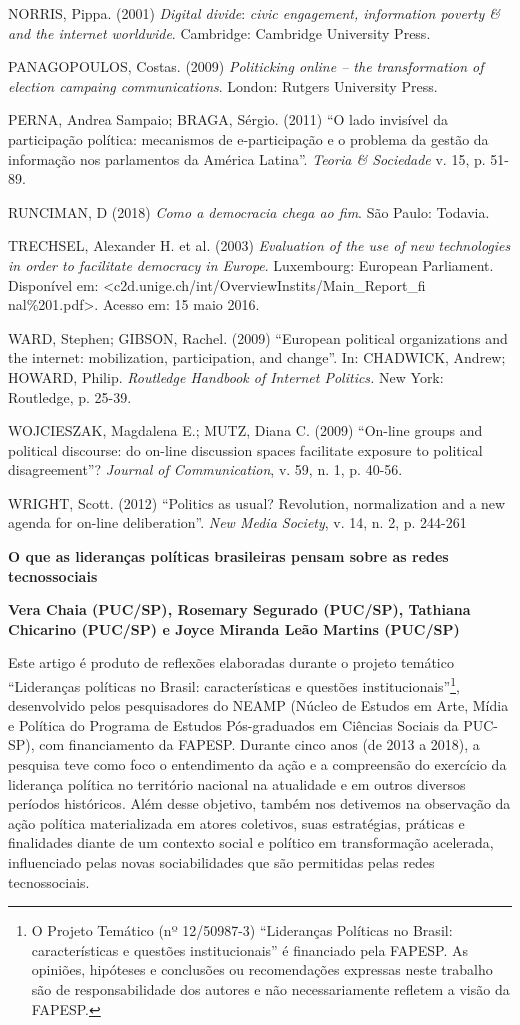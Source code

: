 NORRIS, Pippa. (2001) \emph{Digital divide}: \emph{civic engagement,
information poverty \& and the internet worldwide}. Cambridge: Cambridge
University Press.

PANAGOPOULOS, Costas. (2009) \emph{Politicking online -- the
transformation of election campaing communications}. London: Rutgers
University Press.

PERNA, Andrea Sampaio; BRAGA, Sérgio. (2011) ``O lado invisível da
participação política: mecanismos de e-participação e o problema da
gestão da informação nos parlamentos da América Latina''. \emph{Teoria
\& Sociedade} v. 15, p. 51-89.

RUNCIMAN, D (2018) \emph{Como a democracia chega ao fim}. São Paulo:
Todavia.

TRECHSEL, Alexander H. et al. (2003) \emph{Evaluation of the use of new
technologies in order to facilitate democracy in Europe}. Luxembourg:
European Parliament. Disponível em:
\textless{}c2d.unige.ch/int/OverviewInstits/Main\_Report\_fi
nal\%201.pdf\textgreater{}. Acesso em: 15 maio 2016.

WARD, Stephen; GIBSON, Rachel. (2009) ``European political organizations
and the internet: mobilization, participation, and change''. In:
CHADWICK, Andrew; HOWARD, Philip. \emph{Routledge Handbook of Internet
Politics.} New York: Routledge, p. 25-39.

WOJCIESZAK, Magdalena E.; MUTZ, Diana C. (2009) ``On-line groups and
political discourse: do on-line discussion spaces facilitate exposure to
political disagreement''? \emph{Journal of Communication}, v. 59, n. 1,
p. 40-56.

WRIGHT, Scott. (2012) ``Politics as usual? Revolution, normalization and
a new agenda for on-line deliberation''. \emph{New Media Society}, v.
14, n. 2, p. 244-261

\textbf{O que as lideranças políticas brasileiras pensam sobre as redes
tecnossociais }

\textbf{Vera Chaia (PUC/SP), Rosemary Segurado (PUC/SP), Tathiana
Chicarino (PUC/SP) e Joyce Miranda Leão Martins (PUC/SP)}

Este artigo é produto de reflexões elaboradas durante o projeto temático
``Lideranças políticas no Brasil: características e questões
institucionais''\footnote{O Projeto Temático (nº 12/50987-3)
  ``Lideranças Políticas no Brasil: características e questões
  institucionais'' é financiado pela FAPESP. As opiniões, hipóteses e
  conclusões ou recomendações expressas neste trabalho são de
  responsabilidade dos autores e não necessariamente refletem a visão da
  FAPESP.}, desenvolvido pelos pesquisadores do NEAMP (Núcleo de Estudos
em Arte, Mídia e Política do Programa de Estudos Pós-graduados em
Ciências Sociais da PUC-SP), com financiamento da FAPESP. Durante cinco
anos (de 2013 a 2018), a pesquisa teve como foco o entendimento da ação
e a compreensão do exercício da liderança política no território
nacional na atualidade e em outros diversos períodos históricos. Além
desse objetivo, também nos detivemos na observação da ação política
materializada em atores coletivos, suas estratégias, práticas e
finalidades diante de um contexto social e político em transformação
acelerada, influenciado pelas novas sociabilidades que são permitidas
pelas redes tecnossociais.

